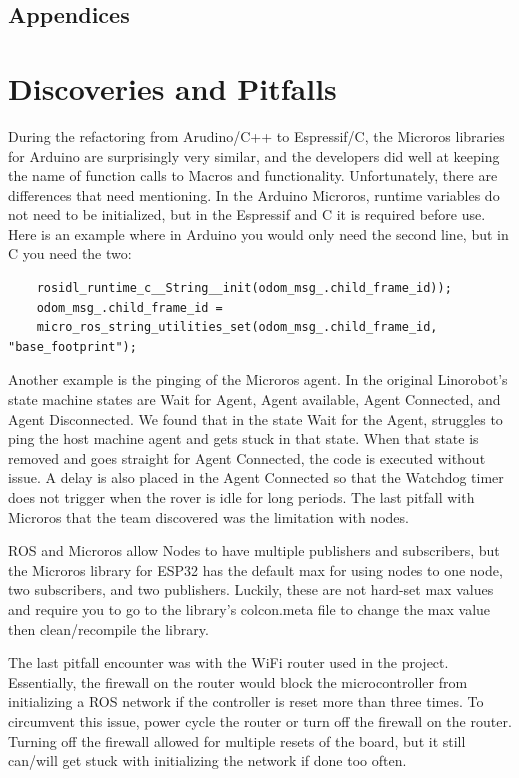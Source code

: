 \documentclass[conference]{IEEEtran}
\begin{document}
\subsection{Appendices}

\section{Discoveries and Pitfalls}  
During the refactoring from Arudino/C++ to Espressif/C, the Microros libraries for Arduino are surprisingly very similar, and the developers did well at keeping the name of function calls to Macros and functionality. Unfortunately, there are differences that need mentioning. In the Arduino Microros, runtime variables do not need to be initialized, but in the Espressif and C it is required before use. Here is an example where in Arduino you would only need the second line, but in C you need the two:

\begingroup
\fontsize{5.70pt}{10pt}\selectfont
\begin{verbatim}  
	rosidl_runtime_c__String__init(odom_msg_.child_frame_id));
	odom_msg_.child_frame_id = 
	micro_ros_string_utilities_set(odom_msg_.child_frame_id, "base_footprint");  
\end{verbatim}  
\endgroup

Another example is the pinging of the Microros agent. In the original Linorobot's state machine states are Wait for Agent, Agent available, Agent Connected, and Agent Disconnected. We found that in the state Wait for the Agent, struggles to ping the host machine agent and gets stuck in that state. When that state is removed and goes straight for Agent Connected, the code is executed without issue. A delay is also placed in the Agent Connected so that the Watchdog timer does not trigger when the rover is idle for long periods. The last pitfall with Microros that the team discovered was the limitation with nodes.

 ROS and Microros allow Nodes to have multiple publishers and subscribers, but the Microros library for ESP32 has the default max for using nodes to one node, two subscribers, and two publishers. Luckily, these are not hard-set max values and require you to go to the library’s colcon.meta file to change the max value then clean/recompile the library.
 
 The last pitfall encounter was with the WiFi router used in the project. Essentially, the firewall on the router would block the microcontroller from initializing a ROS network if the controller is reset more than three times. To circumvent this issue, power cycle the router or turn off the firewall on the router. Turning off the firewall allowed for multiple resets of the board, but it still can/will get stuck with initializing the network if done too often.
 
\nocite{*}

\vspace{12pt}
\end{document}
